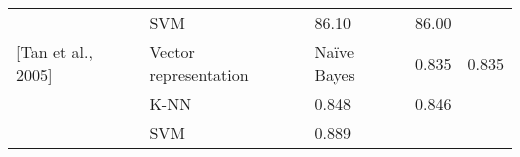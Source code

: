 \documentclass[11pt]{article}
\begin{document}
\begin{longtable}[]{@{}lllll@{}}
\begin{minipage}[t]{0.17\columnwidth}
\strut
\end{minipage} & \begin{minipage}[t]{0.17\columnwidth}\raggedright\strut
SVM\strut
\end{minipage} & \begin{minipage}[t]{0.17\columnwidth}\raggedright\strut
86.10\strut
\end{minipage} & \begin{minipage}[t]{0.17\columnwidth}\raggedright\strut
86.00\strut
\end{minipage}\tabularnewline
\begin{minipage}[t]{0.17\columnwidth}\raggedright\strut
{[}Tan et al., 2005{]}\strut
\end{minipage} & \begin{minipage}[t]{0.17\columnwidth}\raggedright\strut
Vector representation\strut
\end{minipage} & \begin{minipage}[t]{0.17\columnwidth}\raggedright\strut
Naïve Bayes\strut
\end{minipage} & \begin{minipage}[t]{0.17\columnwidth}\raggedright\strut
0.835\strut
\end{minipage} & \begin{minipage}[t]{0.17\columnwidth}\raggedright\strut
0.835\strut
\end{minipage}\tabularnewline
\begin{minipage}[t]{0.17\columnwidth}\raggedright\strut
\strut
\end{minipage} & \begin{minipage}[t]{0.17\columnwidth}\raggedright\strut
K-NN\strut
\end{minipage} & \begin{minipage}[t]{0.17\columnwidth}\raggedright\strut
0.848\strut
\end{minipage} & \begin{minipage}[t]{0.17\columnwidth}\raggedright\strut
0.846\strut
\end{minipage}\tabularnewline
\begin{minipage}[t]{0.17\columnwidth}\raggedright\strut
\strut
\end{minipage} & \begin{minipage}[t]{0.17\columnwidth}\raggedright\strut
SVM\strut
\end{minipage} & \begin{minipage}[t]{0.17\columnwidth}\raggedright\strut
0.889\strut
\end{minipage} & \begin{minipage}[t]{0.17\columnwidth}\raggedright\strut

\end{minipage}
\end{longtable}
\end{document}
